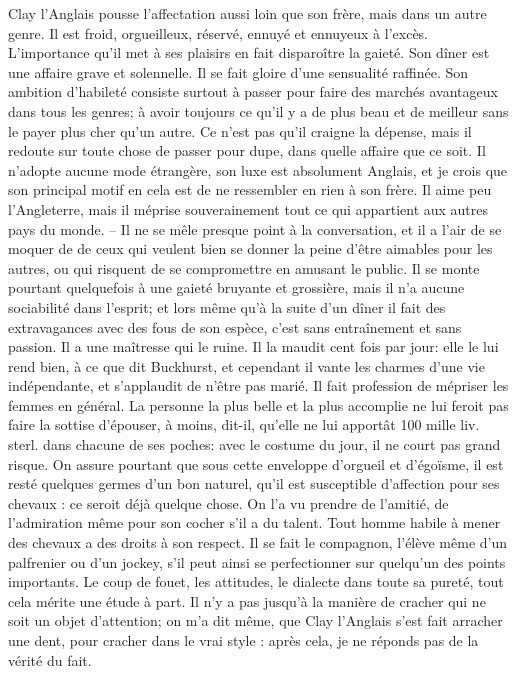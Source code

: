 Clay l'Anglais pousse l'affectation aussi loin que son frère, mais dans un autre genre. Il est froid, orgueilleux, réservé, ennuyé et ennuyeux à l'excès. L'importance qu'il met à ses plaisirs en fait disparoître la gaieté. Son dîner est une affaire grave et solennelle. Il se fait gloire d'une sensualité raffinée. Son ambition d'habileté consiste surtout à passer pour faire des marchés avantageux dans tous les genres; à avoir toujours ce qu'il y a de plus beau et de meilleur sans le payer plus cher qu'un autre. Ce n'est pas qu'il craigne la dépense, mais il redoute sur toute chose de passer pour dupe, dans quelle affaire que ce soit. Il n'adopte aucune mode étrangère, son luxe est absolument Anglais, et je crois\setcounter{page}{124} que son principal motif en cela est de ne ressembler en rien à son frère. Il aime peu l’Angleterre, mais il méprise souverainement tout ce qui appartient aux autres pays du monde. – Il ne se mêle presque point à la conversation, et il a l’air de se moquer de de ceux qui veulent bien se donner la peine d’être aimables pour les autres, ou qui risquent de se compromettre en amusant le public.
Il se monte pourtant quelquefois à une gaieté bruyante et grossière, mais il n’a aucune sociabilité dans l’esprit; et lors même qu’à la suite d’un dîner il fait des extravagances avec des fous de son espèce, c’est sans entraînement et sans passion.
Il a une maîtresse qui le ruine. Il la maudit cent fois par jour: elle le lui rend bien, à ce que dit Buckhurst, et cependant il vante les charmes d’une vie indépendante, et s’applaudit de n’être pas marié. Il fait profession de mépriser les femmes en général. La personne la plus belle et la plus accomplie ne lui feroit pas faire la sottise d’épouser, à moins, dit-il, qu’elle ne lui apportât 100 mille liv. sterl. dans chacune de ses poches: avec le costume du jour, il ne court pas grand risque.\setcounter{page}{125} On assure pourtant que sous cette enveloppe d'orgueil et d'égoïsme, il est resté quelques germes d'un bon naturel, qu'il est susceptible d'affection pour ses chevaux : ce seroit déjà quelque chose. On l'a vu prendre de l'amitié, de l'admiration même pour son cocher s'il a du talent. Tout homme habile à mener des chevaux a des droits à son respect. Il se fait le compagnon, l'élève même d'un palfrenier ou d'un jockey, s'il peut ainsi se perfectionner sur quelqu'un des points importants. Le coup de fouet, les attitudes, le dialecte dans toute sa pureté, tout cela mérite une étude à part. Il n'y a pas jusqu'à la manière de cracher qui ne soit un objet d'attention; on m'a dit même, que Clay l'Anglais s'est fait arracher une dent, pour cracher dans le vrai style : après cela, je ne réponds pas de la vérité du fait.

